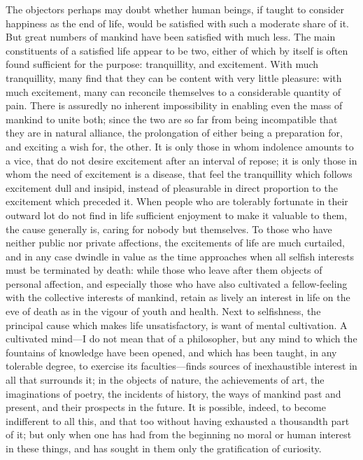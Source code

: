 \documentclass[12pt]{report}
\begin{document}
The objectors perhaps may doubt whether human beings, if taught to consider happiness as the end of life, would be satisfied with such a moderate share of it. But great numbers of mankind have been satisfied with much less. The main constituents of a satisfied life appear to be two, either of which by itself is often found sufficient for the purpose: tranquillity, and excitement. With much tranquillity, many find that they can be content with very little pleasure: with much excitement, many can reconcile themselves to a considerable quantity of pain. There is assuredly no inherent impossibility in enabling even the mass of mankind to unite both; since the two are so far from being incompatible that they are in natural alliance, the prolongation of either being a preparation for, and exciting a wish for, the other. It is only those in whom indolence amounts to a vice, that do not desire excitement after an interval of repose; it is only those in whom the need of excitement is a disease, that feel the tranquillity which follows excitement dull and insipid, instead of pleasurable in direct proportion to the excitement which preceded it. When people who are tolerably fortunate in their outward lot do not find in life sufficient enjoyment to make it valuable to them, the cause generally is, caring for nobody but themselves. To those who have neither public nor private affections, the excitements of life are much curtailed, and in any case dwindle in value as the time approaches when all selfish interests must be terminated by death: while those who leave after them objects of personal affection, and especially those who have also cultivated a fellow-feeling with the collective interests of mankind, retain as lively an interest in life on the eve of death as in the vigour of youth and health. Next to selfishness, the principal cause which makes life unsatisfactory, is want of mental cultivation. A cultivated mind—I do not mean that of a philosopher, but any mind to which the fountains of knowledge have been opened, and which has been taught, in any tolerable degree, to exercise its faculties—finds sources of inexhaustible interest in all that surrounds it; in the objects of nature, the achievements of art, the imaginations of poetry, the incidents of history, the ways of mankind past and present, and their prospects in the future. It is possible, indeed, to become indifferent to all this, and that too without having exhausted a thousandth part of it; but only when one has had from the beginning no moral or human interest in these things, and has sought in them only the gratification of curiosity.
\end{document}

